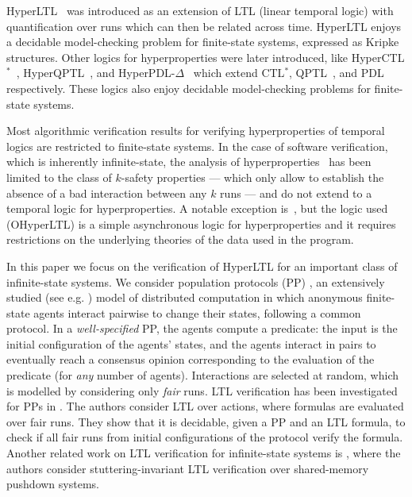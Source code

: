 \documentclass[10pt,a4paper]{article}
\newcommand{\chana}[1]{\todo[color=green!20]{\small #1}}
\begin{document}
HyperLTL~\cite{clarkson14temporal} was introduced as an extension of LTL (linear temporal logic) with quantification over runs which can then be related across time.
%
HyperLTL enjoys a decidable model-checking problem for finite-state systems, expressed as Kripke structures.
%
Other logics for hyperproperties were later introduced, like HyperCTL\(^*\)~\cite{finkbeiner13atemporal}, HyperQPTL~\cite{rabe16temporal,coenen19hierarchy}, and HyperPDL-\(\Delta\)~\cite{gutsfeld20propositional} which extend CTL\(^*\), QPTL~\cite{sistla87complementation}, and PDL~\cite{fischer79propositional} respectively.
%
These logics also enjoy decidable model-checking problems for finite-state systems.

Most algorithmic verification results for verifying hyperproperties of temporal logics are restricted to finite-state systems.
%
In the case of software verification, which is inherently infinite-state, the analysis of hyperproperties~\cite{beutner22software,farzan19automated,shemer19property,sousa16cartesian,unno21constraint} has been limited to the class of \(k\)-safety properties --- which only allow to establish the absence of a bad interaction between any \(k\) runs --- and do not extend to a temporal logic for hyperproperties.
%
A notable exception is~\cite{beutner22software}, but the logic used (OHyperLTL) is a simple asynchronous logic for hyperproperties and it requires restrictions on the underlying theories of the data used in the program.

In this paper we focus on the verification of HyperLTL for an important class of infinite-state systems.
%
We consider population protocols (PP) \cite{First-Pop-Prot}, an extensively studied (see e.g. \cite{AlistarhG18,ElsasserR18,Esparza21}) model of distributed computation in which anonymous finite-state agents interact pairwise to change their states, following a common protocol.
In a \emph{well-specified} PP, the agents compute a predicate: the input is the initial configuration of the agents’ states, and the agents interact in pairs to eventually reach a consensus opinion corresponding to the evaluation of the predicate (for \emph{any} number of agents).
Interactions are selected at random, which is modelled by considering only \emph{fair} runs.
%
LTL verification has been investigated for PPs in \cite{EGLM16}.
The authors consider LTL over actions, where formulas are evaluated over fair runs.
They show that it is decidable, given a PP and an LTL formula, to check if all fair runs from initial configurations of the protocol verify the formula.
%
Another related work on LTL verification for infinite-state systems is \cite{FortinMW17}, where the authors consider stuttering-invariant LTL verification over shared-memory pushdown systems.
\chana{stutt-inv then "defined" below}
\end{document}
